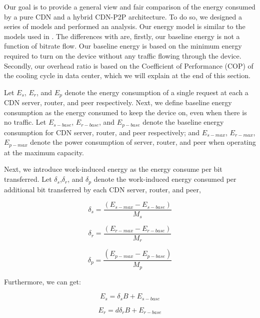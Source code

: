 Our goal is to provide a general view and fair comparison of the energy consumed by a pure CDN and a hybrid CDN-P2P architecture. 
To do so, we designed a series of models and performed an analysis. 
Our energy model is similar to the models used in \cite{Nedevschi:2008:HDC:1855610.1855618}. 
The differences with \cite{Nedevschi:2008:HDC:1855610.1855618} are, firstly, our baseline energy is not a function of bitrate flow. 
Our baseline energy is based on the minimum energy required to turn on the device without any traffic flowing through the device. 
Secondly, our overhead ratio is based on the Coefficient of Performance (COP) of the cooling cycle in data center, which we will explain at the end of this section.

Let $E_s$, $E_r$, and $E_p$ denote the energy consumption of a single request at each a CDN server, router, and peer respectively. 
Next, we define baseline energy consumption as the energy consumed to keep the device on, even when there is no traffic. 
Let $E_{s-base}$, $E_{r-base}$, and $E_{p-base}$ denote the baseline energy consumption for CDN server, router, and peer respectively; and $E_{s-max}$, $E_{r-max}$, $E_{p-max}$ denote the power consumption of server, router, and peer when operating at the maximum capacity. 

Next, we introduce work-induced energy as the energy consume per bit transferred. Let $\delta_s$,$\delta_r$, and $\delta_p$ denote the work-induced energy consumed per additional bit transferred by each CDN server, router, and peer,

\begin{equation}\label{eqn:delta_s}
\delta_s = \frac{(E_{s-max}-E_{s-base})}{M_s}
\end{equation} 

\begin{equation}\label{eqn:delta_r}
\delta_r = \frac{(E_{r-max}-E_{r-base})}{M_r}
\end{equation} 

\begin{equation}\label{eqn:delta_p}
\delta_p = \frac{(E_{p-max}-E_{p-base})}{M_p}
\end{equation} 

Furthermore, we can get:

\begin{equation}\label{eqn:E_s}
E_s = \delta_s B + E_{s-base}
\end{equation} 

\begin{equation}\label{eqn:E_r}
E_r = d \delta_r B + E_{r-base}
\end{equation} 

